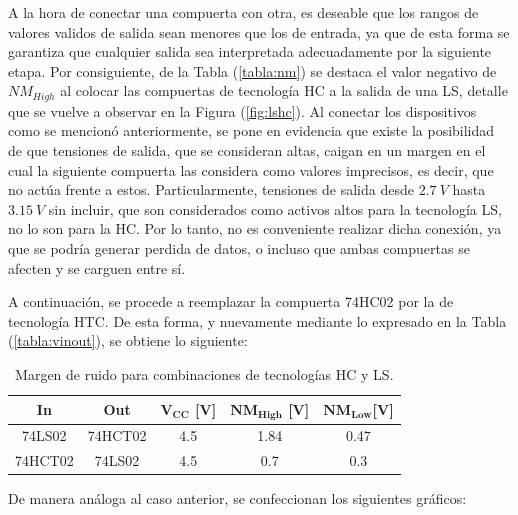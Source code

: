 A la hora de conectar una compuerta con otra, es deseable que los rangos de valores validos de salida sean menores que los de entrada, ya que de esta forma se garantiza que cualquier salida sea interpretada adecuadamente por la siguiente etapa. Por consiguiente, de la Tabla (\ref{tabla:nm}) se destaca el valor negativo de $NM_{High}$ al colocar las compuertas de tecnología HC a la salida de una LS, detalle que se vuelve a observar en la Figura (\ref{fig:lshc}). Al conectar los dispositivos como se mencionó anteriormente, se pone en evidencia que existe la posibilidad de que tensiones de salida, que se consideran altas, caigan en un margen en el cual la siguiente compuerta las considera como valores imprecisos, es decir, que no actúa frente a estos. Particularmente, tensiones de salida desde $2.7 \ V$ hasta $3.15 \ V$ sin incluir, que son considerados como activos altos para la tecnología LS, no lo son para la HC. Por lo tanto, no es conveniente realizar dicha conexión, ya que se podría generar perdida de datos, o incluso que ambas compuertas se afecten y se carguen entre sí.

A continuación, se procede a reemplazar la compuerta 74HC02 por la de tecnología HTC. De esta forma, y nuevamente mediante lo expresado en la Tabla (\ref{tabla:vinout}), se obtiene lo siguiente:

\begin{table}[H]
\centering
\begin{tabular}{ccccc}
\hline
\textbf{In} & \textbf{Out} & $\mathbf{V_{CC}}$ \textbf{[V]} & $\mathbf{NM_{High}}$ \textbf{[V]} & $\mathbf{NM_{Low}} $\textbf{[V]} \\ \hline
74LS02      & 74HCT02       & 4.5                            & 1.84                              & 0.47                              \\ 
74HCT02      & 74LS02       & 4.5                            & 0.7                             & 0.3     		                    \\ \hline
\end{tabular}
\caption{Margen de ruido para combinaciones de tecnologías HC y LS.}
\label{tabla:nm2}
\end{table}

De manera análoga al caso anterior, se confeccionan los siguientes gráficos:

